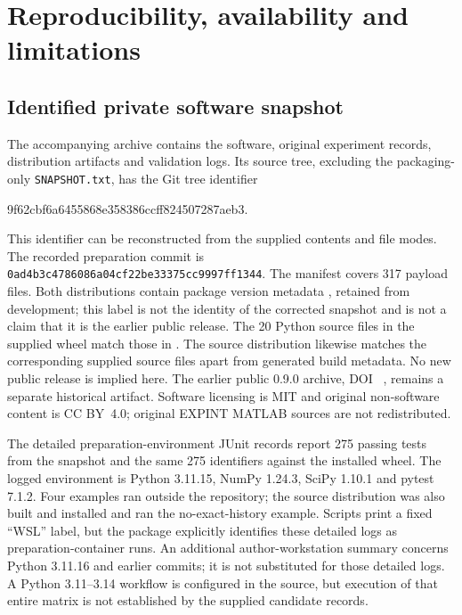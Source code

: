 \section{Reproducibility, availability and limitations}\label{sec:repro}

\subsection{Identified private software snapshot}

The accompanying archive 
contains the software, original experiment records, distribution artifacts
and validation logs.  Its source tree, excluding the packaging-only
\texttt{SNAPSHOT.txt}, has the Git tree identifier
\begin{center}\small\ttfamily
9f62cbf6a6455868e358386ccff824507287aeb3.
\end{center}
This identifier can be reconstructed from the supplied contents and file
modes.  The recorded preparation commit is
\texttt{0ad4b3c4786086a04cf22be33375cc9997ff1344}.  The manifest covers
317 payload files.  Both distributions contain package version metadata
\releaseversion{}, retained from development; this label is not the identity
of the corrected snapshot and is not a claim that it is the earlier public
release.  The 20 Python source files in the supplied wheel match those in
.  The source distribution likewise matches the
corresponding supplied source files apart from generated build metadata.
No new public release is implied here.  The earlier public 0.9.0 archive,
DOI ~\cite{VillatoroPyEXPINT090}, remains a
separate historical artifact.  Software licensing is MIT and original
non-software content is CC BY~4.0; original EXPINT MATLAB sources are not
redistributed.

The detailed preparation-environment JUnit records report 275 passing tests
from the snapshot and the same 275 identifiers against the installed wheel.
The logged environment is Python 3.11.15, NumPy 1.24.3, SciPy 1.10.1 and
pytest 7.1.2.  Four examples ran outside the repository; the source
distribution was also built and installed and ran the no-exact-history
example.  Scripts print a fixed ``WSL'' label, but the package explicitly
identifies these detailed logs as preparation-container runs.  An additional
author-workstation summary concerns Python 3.11.16 and earlier commits; it
is not substituted for those detailed logs.  A Python 3.11--3.14 workflow is
configured in the source, but execution of that entire matrix is not
established by the supplied candidate records.

